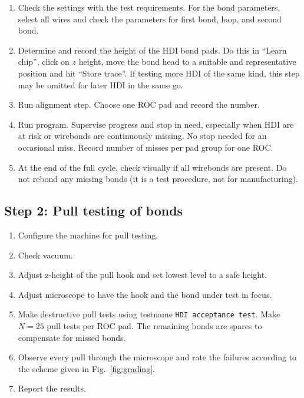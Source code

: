 \documentclass[10pt]{unlsilabsop}
\begin{document}
\begin{enumerate}
    \item Check the settings with the test requirements. For the bond parameters, select all wires and check the parameters for first bond, loop, and second bond.
    \item Determine and record the height of the HDI bond pads. Do this in ``Learn chip'', click on $z$ height, move the bond head to a suitable and representative position and hit ``Store trace''. If testing more HDI of the same kind, this step may be omitted for later HDI in the same go.
    \item Run alignment step. Choose one ROC pad and record the number.
    \item Run program. Supervise progress and stop in need, especially when HDI are at risk or wirebonds are continuously missing. No stop needed for an occasional miss. Record number of misses per pad group for one ROC.
    \item At the end of the full cycle, check visually if all wirebonds are present. Do not rebond any missing bonds (it is a test procedure, not for manufacturing).
\end{enumerate}
\subsection{Step 2: Pull testing of bonds}
\begin{enumerate}
    \item Configure the machine for pull testing.
    \item Check vacuum.
    \item Adjust z-height of the pull hook and set lowest level to a safe height.
    \item Adjust microscope to have the hook and the bond under test in focus.
    \item Make destructive pull tests using testname \texttt{HDI acceptance test}. Make $N=25$ pull tests per ROC pad. The remaining bonds are spares to compensate for missed bonds.
    \item Observe every pull through the microscope and rate the failures according to the scheme given in Fig.~\ref{fig:grading}.
    \item Report the results.
\end{enumerate}
\end{document}
